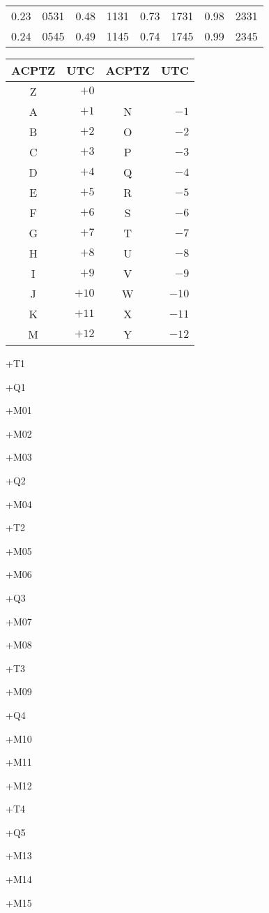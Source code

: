 \documentclass[10pt]{book}
\begin{document}
\begin{center}
\begin{tabular}{rr|rr|rr|rr}
        0.23 & 0531 & 0.48 & 1131 & 0.73 & 1731 & 0.98 & 2331 \\
        0.24 & 0545 & 0.49 & 1145 & 0.74 & 1745 & 0.99 & 2345 \\
        \bottomrule
    \end{tabular}
    \hfill
    \begin{tabular}{cr|cr}
        \toprule
        \textbf{ACPTZ} & \textbf{UTC} & \textbf{ACPTZ} & \textbf{UTC} \\
        \midrule
        Z & $ +0$ &   &       \\
        A & $ +1$ & N &  $-1$ \\
        B & $ +2$ & O &  $-2$ \\
        C & $ +3$ & P &  $-3$ \\
        D & $ +4$ & Q &  $-4$ \\
        E & $ +5$ & R &  $-5$ \\
        F & $ +6$ & S &  $-6$ \\
        G & $ +7$ & T &  $-7$ \\
        H & $ +8$ & U &  $-8$ \\
        I & $ +9$ & V &  $-9$ \\
        J & $+10$ & W & $-10$ \\
        K & $+11$ & X & $-11$ \\
        M & $+12$ & Y & $-12$ \\
        \bottomrule
    \end{tabular}
    \hspace*{\fill}
    \vspace*{\fill}
\end{center}

+T1

+Q1

+M01

+M02

+M03

+Q2

+M04

+T2

+M05

+M06

+Q3

+M07

+M08

+T3

+M09

+Q4

+M10

+M11

+M12

+T4

+Q5

+M13

+M14

+M15
\end{document}
